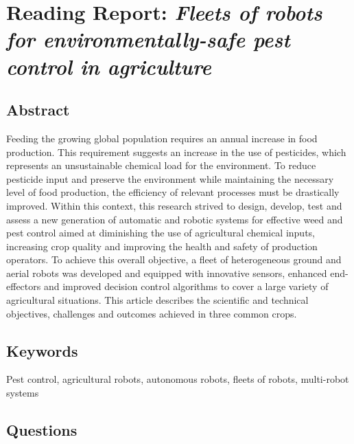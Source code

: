\documentclass{article}
\begin{document}


\section{Reading Report: \emph{Fleets of robots for environmentally-safe pest control in agriculture}}
\cite{deSantos2016}

\subsection*{Abstract}
Feeding the growing global population requires an annual increase in food
production. This requirement suggests an increase in the use of pesticides, which represents
an unsustainable chemical load for the environment. To reduce pesticide input and preserve the environment while maintaining the necessary level of food production, the
efficiency of relevant processes must be drastically improved. Within this context, this
research strived to design, develop, test and assess a new generation of automatic and
robotic systems for effective weed and pest control aimed at diminishing the use of
agricultural chemical inputs, increasing crop quality and improving the health and safety of
production operators. To achieve this overall objective, a fleet of heterogeneous ground
and aerial robots was developed and equipped with innovative sensors, enhanced end-effectors and improved decision control algorithms to cover a large variety of agricultural
situations. This article describes the scientific and technical objectives, challenges and
outcomes achieved in three common crops.

\subsection*{Keywords}
Pest control, agricultural robots, autonomous robots, fleets of robots, multi-robot systems


\subsection*{Questions}
\end{document}
